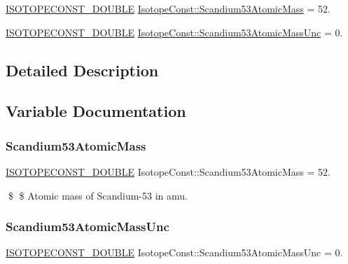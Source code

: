 \begin{DoxyCompactItemize}
\item 
\mbox{\hyperlink{group___isotope_const-_macros_ga8f45a7272ce02c0b4c65c44636ed719a}{I\+S\+O\+T\+O\+P\+E\+C\+O\+N\+S\+T\+\_\+\+D\+O\+U\+B\+LE}} \mbox{\hyperlink{group___isotope_const-_scandium-_sc53_gab4872e6188e6bdc8e99d75520bd726fc}{Isotope\+Const\+::\+Scandium53\+Atomic\+Mass}} = 52.
\item 
\mbox{\hyperlink{group___isotope_const-_macros_ga8f45a7272ce02c0b4c65c44636ed719a}{I\+S\+O\+T\+O\+P\+E\+C\+O\+N\+S\+T\+\_\+\+D\+O\+U\+B\+LE}} \mbox{\hyperlink{group___isotope_const-_scandium-_sc53_ga8e483e600f248f1819014d4b871f1f7d}{Isotope\+Const\+::\+Scandium53\+Atomic\+Mass\+Unc}} = 0.
\end{DoxyCompactItemize}


\subsection{Detailed Description}


\subsection{Variable Documentation}
\mbox{\label{group___isotope_const-_scandium-_sc53_gab4872e6188e6bdc8e99d75520bd726fc}} 
\subsubsection{\texorpdfstring{Scandium53\+Atomic\+Mass}{Scandium53AtomicMass}}
{\footnotesize\ttfamily \mbox{\hyperlink{group___isotope_const-_macros_ga8f45a7272ce02c0b4c65c44636ed719a}{I\+S\+O\+T\+O\+P\+E\+C\+O\+N\+S\+T\+\_\+\+D\+O\+U\+B\+LE}} Isotope\+Const\+::\+Scandium53\+Atomic\+Mass = 52.}

\$ \$ Atomic mass of Scandium-\/53 in amu. \mbox{\label{group___isotope_const-_scandium-_sc53_ga8e483e600f248f1819014d4b871f1f7d}} 
\subsubsection{\texorpdfstring{Scandium53\+Atomic\+Mass\+Unc}{Scandium53AtomicMassUnc}}
{\footnotesize\ttfamily \mbox{\hyperlink{group___isotope_const-_macros_ga8f45a7272ce02c0b4c65c44636ed719a}{I\+S\+O\+T\+O\+P\+E\+C\+O\+N\+S\+T\+\_\+\+D\+O\+U\+B\+LE}} Isotope\+Const\+::\+Scandium53\+Atomic\+Mass\+Unc = 0.}

